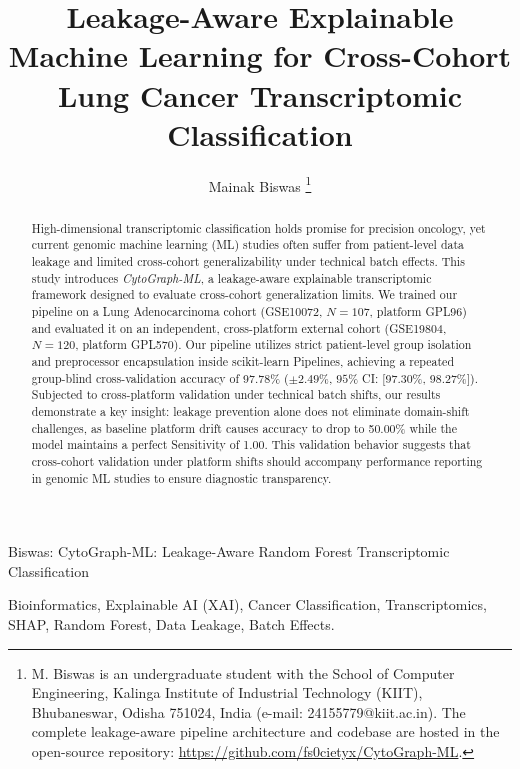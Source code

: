 \documentclass[journal,10pt]{IEEEtran}
\begin{document}
\title{Leakage-Aware Explainable Machine Learning for Cross-Cohort Lung Cancer Transcriptomic Classification}

\author{Mainak Biswas%
\thanks{M. Biswas is an undergraduate student with the School of Computer Engineering, Kalinga Institute of Industrial Technology (KIIT), Bhubaneswar, Odisha 751024, India (e-mail: 24155779@kiit.ac.in). The complete leakage-aware pipeline architecture and codebase are hosted in the open-source repository: \url{https://github.com/fs0cietyx/CytoGraph-ML}.}}

%
{Biswas: CytoGraph-ML: Leakage-Aware Random Forest Transcriptomic Classification}

\maketitle

\begin{abstract}
High-dimensional transcriptomic classification holds promise for precision oncology, yet current genomic machine learning (ML) studies often suffer from patient-level data leakage and limited cross-cohort generalizability under technical batch effects. This study introduces \textit{CytoGraph-ML}, a leakage-aware explainable transcriptomic framework designed to evaluate cross-cohort generalization limits. We trained our pipeline on a Lung Adenocarcinoma cohort (GSE10072, $N=107$, platform GPL96) and evaluated it on an independent, cross-platform external cohort (GSE19804, $N=120$, platform GPL570). Our pipeline utilizes strict patient-level group isolation and preprocessor encapsulation inside scikit-learn Pipelines, achieving a repeated group-blind cross-validation accuracy of 97.78\% ($\pm 2.49\%$, $95\%$ CI: [97.30\%, 98.27\%]). Subjected to cross-platform validation under technical batch shifts, our results demonstrate a key insight: leakage prevention alone does not eliminate domain-shift challenges, as baseline platform drift causes accuracy to drop to 50.00\% while the model maintains a perfect Sensitivity of 1.00. This validation behavior suggests that cross-cohort validation under platform shifts should accompany performance reporting in genomic ML studies to ensure diagnostic transparency.
\end{abstract}

\begin{IEEEkeywords}
Bioinformatics, Explainable AI (XAI), Cancer Classification, Transcriptomics, SHAP, Random Forest, Data Leakage, Batch Effects.
\end{IEEEkeywords}
\end{document}
